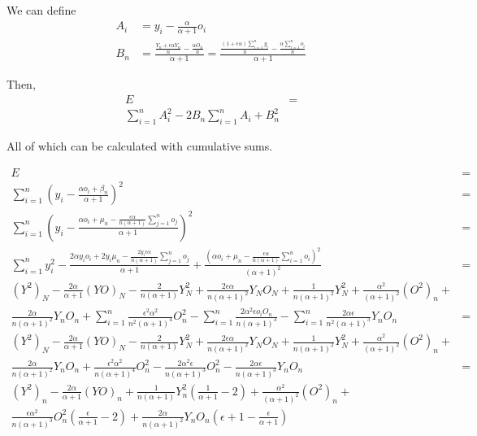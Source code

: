 \documentclass{article}
\begin{document}
We can define \begin{align*}
    A_i &= y_i - \frac{\alpha}{\alpha + 1}o_i \\
    B_n &= \frac{\frac{Y_n + \epsilon \alpha Y_n}{n} - \frac{\alpha O_n}{n}}{\alpha + 1} = \frac{\frac{(1 + \epsilon \alpha)\sum_{i=1}^n y_i}{n} - \frac{\alpha \sum_{i=1}^n o_i}{n}}{\alpha + 1}
\end{align*}

Then, \begin{align*}
    E &= \\
    \sum_{i=1}^n A_i^2 - 2B_n\sum_{i=1}^n A_i + B_n^2
\end{align*}

All of which can be calculated with cumulative sums.

\begin{align*}
    E &= \\
    \sum_{i=1}^n (y_i - \frac{\alpha o_i + \beta_n}{\alpha + 1})^2 &= \\
    \sum_{i=1}^n (y_i - \frac{\alpha o_i + \mu_n - \frac{\epsilon \alpha}{n(\alpha + 1)} \sum_{j=1}^{n} o_j}{\alpha + 1})^2 &= \\
    \sum_{i=1}^{n} y_i^2 - \frac{2\alpha y_i o_i + 2y_i \mu_n - \frac{2y_i \epsilon \alpha}{n(\alpha + 1)} \sum_{j=1}^{n} o_j}{\alpha + 1} + \frac{\left( \alpha o_i + \mu_n - \frac{\epsilon \alpha }{n(\alpha + 1)} \sum_{i=1}^{n} o_i \right) ^2}{(\alpha + 1)^2} &= \\
    (Y^2)_N - \frac{2\alpha}{\alpha + 1} (YO)_N - \frac{2}{n(\alpha + 1)} Y_N^2 + \frac{2\epsilon \alpha}{n(\alpha + 1)^2} Y_NO_N + \frac{1}{n(\alpha + 1)^2} Y_N^2 + \frac{\alpha^2}{(\alpha + 1)^2} (O^2)_n + \\
    \frac{2\alpha}{n(\alpha + 1)^2} Y_nO_n + \sum_{i=1}^n \frac{\epsilon^2 \alpha^2}{n^2(\alpha + 1)^4} O_n^2 - \sum_{i=1}^n \frac{2\alpha^2 \epsilon o_i O_n}{n(\alpha + 1)^3} - \sum_{i=1}^n \frac{2\alpha \epsilon}{n^2(\alpha + 1)^3} Y_nO_n&= \\
    (Y^2)_N - \frac{2\alpha}{\alpha + 1} (YO)_N - \frac{2}{n(\alpha + 1)} Y_N^2 + \frac{2\epsilon \alpha}{n(\alpha + 1)^2} Y_NO_N + \frac{1}{n(\alpha + 1)^2}Y^2_N + \frac{\alpha^2}{(\alpha + 1)^2} (O^2)_n +  \\
    \frac{2\alpha}{n(\alpha + 1)^2} Y_nO_n + \frac{\epsilon^2 \alpha^2}{n(\alpha + 1)^4} O_n^2 - \frac{2\alpha^2 \epsilon}{n(\alpha + 1)^3} O_n^2 - \frac{2\alpha \epsilon}{n(\alpha + 1)^3} Y_nO_n&= \\
    (Y^2)_n - \frac{2\alpha}{\alpha + 1}(YO)_n + \frac{1}{n(\alpha + 1)} Y^2_n \left( \frac{1}{\alpha + 1} - 2\right) + \frac{\alpha^2}{(\alpha + 1)^2} (O^2)_n + \\
    \frac{\epsilon \alpha^2}{n(\alpha + 1)^3} O_n^2 \left( \frac{\epsilon}{\alpha + 1} - 2 \right) + \frac{2\alpha}{n(\alpha + 1)^2}Y_nO_n \left(\epsilon + 1 - \frac{\epsilon}{\alpha + 1} \right)
\end{align*}
\end{document}
